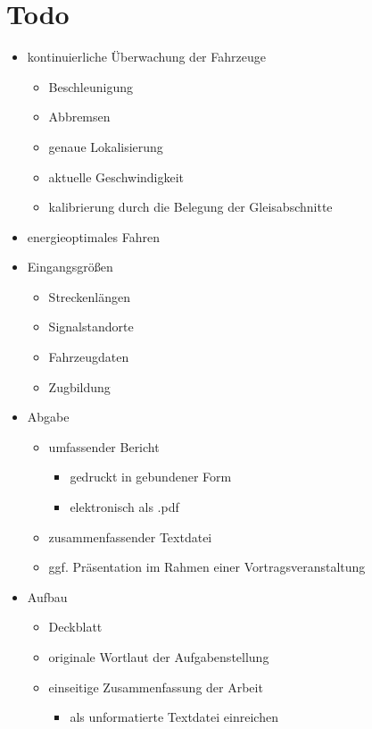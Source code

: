 \section{Todo}

\begin{itemize}
\item kontinuierliche Überwachung der Fahrzeuge
\begin{itemize}
\item Beschleunigung
\item Abbremsen
\item genaue Lokalisierung
\item aktuelle Geschwindigkeit
\item kalibrierung durch die Belegung der Gleisabschnitte
\end{itemize}
\item energieoptimales Fahren
\item Eingangsgrößen
\begin{itemize}
\item Streckenlängen
\item Signalstandorte
\item Fahrzeugdaten
\item Zugbildung
\end{itemize}
\item Abgabe
\begin{itemize}
\item umfassender Bericht
\begin{itemize}
\item gedruckt in gebundener Form
\item elektronisch als .pdf
\end{itemize}
\item zusammenfassender Textdatei
\item ggf. Präsentation im Rahmen einer Vortragsveranstaltung
\end{itemize}
\item Aufbau
\begin{itemize}
\item Deckblatt
\item originale Wortlaut der Aufgabenstellung
\item einseitige Zusammenfassung der Arbeit
\begin{itemize}
\item als unformatierte Textdatei einreichen
\end{itemize}
\end{itemize}
\end{itemize}